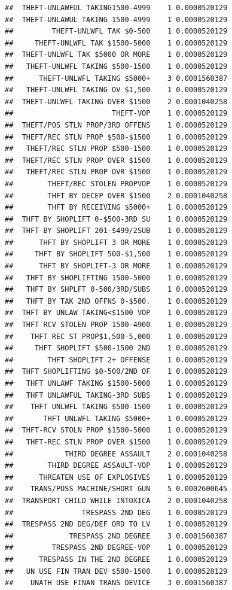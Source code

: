\documentclass[]{book}
\begin{document}
\begin{verbatim}
##  THEFT-UNLAWFUL TAKING1500-4999    1 0.0000520129
##  THEFT-UNLAWUL TAKING 1500-4999    1 0.0000520129
##         THEFT-UNLWFL TAK $0-500    1 0.0000520129
##     THEFT-UNLWFL TAK $1500-5000    1 0.0000520129
##  THEFT-UNLWFL TAK $5000 OR MORE    1 0.0000520129
##   THEFT-UNLWFL TAKING $500-1500    1 0.0000520129
##      THEFT-UNLWFL TAKING $5000+    3 0.0001560387
##   THEFT-UNLWFL TAKING OV $1,500    1 0.0000520129
##  THEFT-UNLWFL TAKING OVER $1500    2 0.0001040258
##                       THEFT-VOP    1 0.0000520129
##  THEFT/POS STLN PROP/3RD OFFENS    1 0.0000520129
##  THEFT/REC STLN PROP $500-$1500    1 0.0000520129
##   THEFT/REC STLN PROP $500-1500    1 0.0000520129
##  THEFT/REC STLN PROP OVER $1500    1 0.0000520129
##   THEFT/REC STLN PROP OVR $1500    1 0.0000520129
##        THEFT/REC STOLEN PROPVOP    1 0.0000520129
##        THFT BY DECEP OVER $1500    2 0.0001040258
##        THFT BY RECEIVING $5000+    1 0.0000520129
##  THFT BY SHOPLIFT 0-$500-3RD SU    1 0.0000520129
##  THFT BY SHOPLIFT 201-$499/2SUB    1 0.0000520129
##      THFT BY SHOPLIFT 3 OR MORE    1 0.0000520129
##     THFT BY SHOPLIFT 500-$1,500    1 0.0000520129
##      THFT BY SHOPLIFT-3 OR MORE    1 0.0000520129
##   THFT BY SHOPLIFTING 1500-5000    1 0.0000520129
##   THFT BY SHPLFT 0-500/3RD/SUBS    1 0.0000520129
##   THFT BY TAK 2ND OFFNS 0-$500.    1 0.0000520129
##  THFT BY UNLAW TAKING<$1500 VOP    1 0.0000520129
##  THFT RCV STOLEN PROP 1500-4900    1 0.0000520129
##    THFT REC ST PROP$1,500-5,000    1 0.0000520129
##     THFT SHOPLIFT $500-1500 2ND    1 0.0000520129
##        THFT SHOPLIFT 2+ OFFENSE    1 0.0000520129
##  THFT SHOPLIFTING $0-500/2ND OF    1 0.0000520129
##   THFT UNLAWF TAKING $1500-5000    1 0.0000520129
##   THFT UNLAWFUL TAKING-3RD SUBS    1 0.0000520129
##    THFT UNLWFL TAKING $500-1500    1 0.0000520129
##       THFT UNLWFL TAKING $5000+    1 0.0000520129
##  THFT-RCV STOLN PROP $1500-5000    1 0.0000520129
##   THFT-REC STLN PROP OVER $1500    1 0.0000520129
##            THIRD DEGREE ASSAULT    2 0.0001040258
##        THIRD DEGREE ASSAULT-VOP    1 0.0000520129
##      THREATEN USE OF EXPLOSIVES    1 0.0000520129
##    TRANS/POSS MACHINE/SHORT GUN    5 0.0002600645
##  TRANSPORT CHILD WHILE INTOXICA    2 0.0001040258
##                TRESPASS 2ND DEG    1 0.0000520129
##  TRESPASS 2ND DEG/DEF ORD TO LV    1 0.0000520129
##             TRESPASS 2ND DEGREE    3 0.0001560387
##         TRESPASS 2ND DEGREE-VOP    1 0.0000520129
##      TRESPASS IN THE 2ND DEGREE    1 0.0000520129
##   UN USE FIN TRAN DEV $500-1500    1 0.0000520129
##    UNATH USE FINAN TRANS DEVICE    3 0.0001560387

\end{verbatim}
\end{document}
